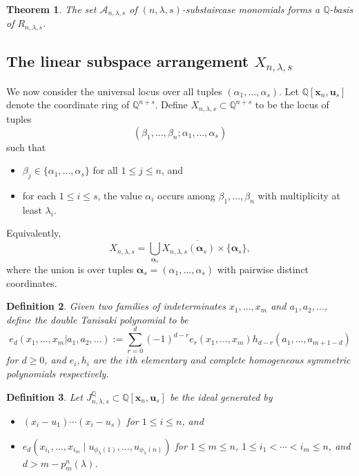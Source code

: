 \documentclass[11pt]{amsart}
\numberwithin{equation}{section}
\newtheorem{theorem}{Theorem}[section]
\newtheorem{definition}[theorem]{Definition}
\theoremstyle{definition}
\newcommand{\AAA}{{\mathcal{A}}}
\newcommand{\QQ}{{\mathbb{Q}}}
\newcommand{\xxx}{{\mathbf{x}}}
\newcommand{\uuu}{{\mathbf{u}}}
\newcommand{\aalpha}{{{\bm \alpha}}}
\begin{document}
\begin{theorem}\cite{G}\label{thm: griffin-basis}
    The set $\AAA_{n,\lambda,s}$ of $(n,\lambda,s)$-substaircase monomials forms a $\QQ$-basis of $R_{n,\lambda,s}$.
\end{theorem}

\subsection{The linear subspace arrangement $X_{n,\lambda,s}$}

We now consider the universal locus over all tuples $(\alpha_1,\dots,\alpha_s)$.
Let $\QQ[\xxx_n,\uuu_s]$ denote the coordinate ring of $\QQ^{n+s}$. Define
$X_{n,\lambda,s}\subset \QQ^{n+s}$ to be the locus of tuples
\[
(\beta_1,\dots,\beta_n;\alpha_1,\dots,\alpha_s)
\]
such that
\begin{itemize}
    \item $\beta_j\in\{\alpha_1,\dots,\alpha_s\}$ for all $1\leq j\leq n$, and
    \item for each $1\leq i\leq s$, the value $\alpha_i$ occurs among
    $\beta_1,\dots,\beta_n$ with multiplicity at least $\lambda_i$.
\end{itemize}
Equivalently,
\[
X_{n,\lambda,s}=
\overline{\bigcup_{\aalpha_s}
X_{n,\lambda,s}(\aalpha_s)\times \{\aalpha_s\}},
\]
where the union is over tuples $\aalpha_s=(\alpha_1,\dots,\alpha_s)$ with
pairwise distinct coordinates.

\begin{definition}\cite{AH}\label{defn: double-e}
    Given two families of indeterminates $x_1,\dots,x_m$ and $a_1,a_2,\dots$, define the \emph{double Tanisaki polynomial} to be
    \begin{equation}\label{eq: def-double-e}
        e_d(x_1,\dots,x_m | a_1,a_2,\dots ) := \sum_{r = 0}^d (-1)^{d-r} e_r(x_1,\dots,x_m)h_{d-r}(a_1,\dots,a_{m+1-d})
    \end{equation}
    for $d \geq 0$, and $e_i, h_i$ are the $i$th elementary and complete homogeneous symmetric polynomials respectively.
\end{definition}

\begin{definition}\label{def: ideal-jqnls}
    Let $J^\QQ_{n,\lambda,s}\subset \QQ[\xxx_n,\uuu_s]$ be the ideal generated by
    \begin{itemize}
        \item $(x_i-u_1)\cdots (x_i-u_s)$ for $1\leq i\leq n$, and
        \item $e_d(x_{i_1},\dots,x_{i_m}\mid u_{\phi_\lambda(1)},\dots,u_{\phi_\lambda(n)})$
        for $1\leq m\leq n$, $1\leq i_1<\cdots<i_m\leq n$, and
        $d>m-p_m^n(\lambda)$.
    \end{itemize}
\end{definition}
\end{document}
